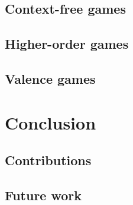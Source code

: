 \documentclass%
[%
    a4paper,                 %
    11pt,                    %
    parskip=half-,           %
    numbers=noenddot,        %
    twoside,                 %
    fleqn,                   %
    toc=chapterentrywithdots,%
    cleardoublepage=plain,   %
]
{style/smbook}
\begin{document}
    \chapter{Context-free games}%
    \label{Chapter:ContextFreeGames}%
    \chaptertoc%
        
        
        \clearpage
        
        \clearpage
        
        \clearpage
        
        \clearpage
        
        \clearpage
        
        \clearpage
        
        \clearpage
        
        \clearpage
        

    \chapter{Higher-order games}%
    \label{Chapter:HOGames}%
    \chaptertoc%
        
        
        \clearpage
        
        \clearpage
        
        \clearpage
        
        \clearpage
        

    \chapter{Valence games}%
    \label{Chapter:ValenceGames}%
    \chaptertoc%
        
        
        \clearpage
        
        \clearpage
        


\part{Conclusion}%
\label{Part:Conclusion}%

    \chapter{Contributions}%
    \label{Chapter:Contributions}%
    

    \chapter{Future work}%
    \label{Chapter:FutureWork}%
    


\cleardoublepage%
%
%
\printbibliography%

\emptysheet%
\end{document}
